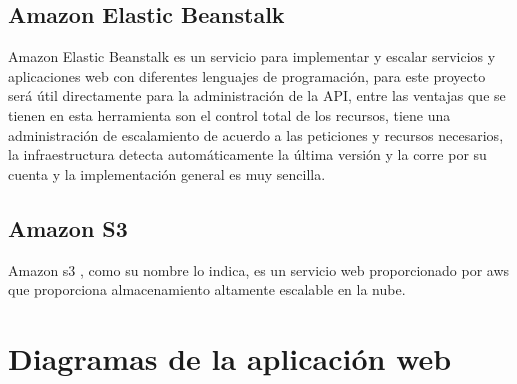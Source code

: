 \documentclass[12pt, a4paper, titlepage]{article}
\begin{document}
	\subsection{Amazon Elastic Beanstalk}	
	Amazon Elastic Beanstalk \cite{amazon_elastic_beanstalk} es un servicio para implementar y escalar servicios y aplicaciones web con diferentes lenguajes de programación, para este proyecto será útil directamente para la administración de la API, entre las ventajas que se tienen en esta herramienta son el control total de los recursos, tiene una administración de escalamiento de acuerdo a las peticiones y recursos necesarios, la infraestructura detecta automáticamente la última versión y la corre por su cuenta y la implementación general es muy sencilla.

	\subsection{Amazon S3}
	Amazon \acrfull{s3} \cite{amazon_s3}, como su nombre lo indica, es un servicio web proporcionado por \acrfull{aws} que proporciona almacenamiento altamente escalable en la nube.
	\newpage
	\section{Diagramas de la aplicación web}
\end{document}
